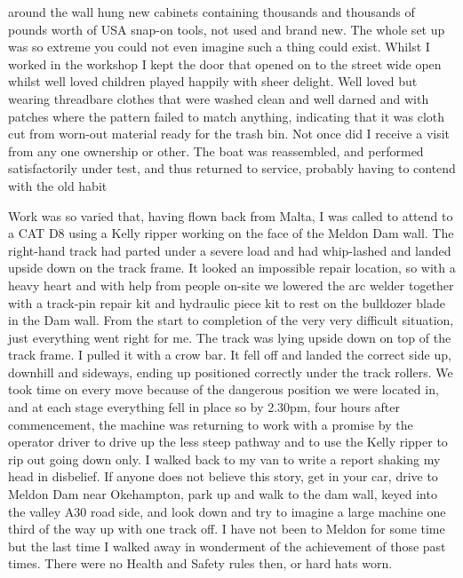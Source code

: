 around the wall hung new cabinets containing thousands and thousands of pounds
worth of USA snap-on tools, not used and brand new. The whole set up was so
extreme you could not even imagine such a thing could exist. Whilst I worked in
the workshop I kept the door that opened on to the street wide open whilst well
loved children played happily with sheer delight. Well loved but wearing
threadbare clothes that were washed clean and well darned and with patches
where the pattern failed to match anything, indicating that it was cloth cut
from worn-out material ready for the trash bin. Not once did I receive a visit
from any one ownership or other. The boat was reassembled, and performed
satisfactorily under test, and thus returned to service, probably having to
contend with the old habit

Work was so varied that, having flown back from Malta, I was called to attend to
a CAT D8 using a Kelly ripper working on the face of the Meldon Dam wall. The
right-hand track had parted under a severe load and had whip-lashed and landed
upside down on the track frame. It looked an impossible repair location, so
with a heavy heart and with help from people on-site we lowered the arc welder
together with a track-pin repair kit and hydraulic piece kit to rest on the
bulldozer blade in the Dam wall. From the start to completion of the very very
difficult situation, just everything went right for me. The track was lying
upside down on top of the track frame. I pulled it with a crow bar. It fell off
and landed the correct side up, downhill and sideways, ending up positioned
correctly under the track rollers. We took time on every move because of the
dangerous position we were located in, and at each stage everything fell in
place so by 2.30pm, four hours after commencement, the machine was returning to
work with a promise by the operator driver to drive up the less steep pathway
and to use the Kelly ripper to rip out going down only. I walked back to my van
to write a report shaking my head in disbelief. If anyone does not believe this
story, get in your car, drive to Meldon Dam near Okehampton, park up and walk
to the dam wall, keyed into the valley A30 road side, and look down and try to
imagine a large machine one third of the way up with one track off. I have not
been to Meldon for some time but the last time I walked away in wonderment of
the achievement of those past times. There were no Health and Safety rules
then, or hard hats worn.
